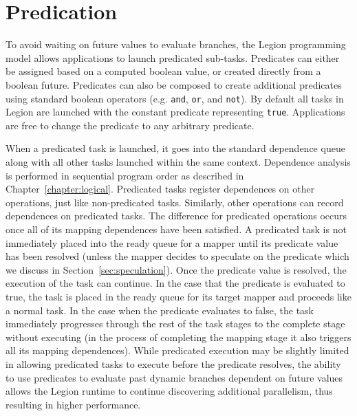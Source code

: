 \section{Predication}
\label{sec:predication}
To avoid waiting on future values to evaluate
branches, the Legion programming model allows applications
to launch predicated sub-tasks. Predicates can either
be assigned based on a computed boolean value, or 
created directly from a boolean future. Predicates can
also be composed to create additional predicates using
standard boolean operators (e.g. {\tt and}, {\tt or},
and {\tt not}). By default all tasks in Legion are
launched with the constant predicate representing 
{\tt true}. Applications are free to change the predicate
to any arbitrary predicate.

When a predicated task is launched, it goes into the
standard dependence queue along with all other tasks
launched within the same context. Dependence analysis
is performed in sequential program order as described
in Chapter~\ref{chapter:logical}. Predicated tasks
register dependences on other operations, just like
non-predicated tasks. Similarly, other operations can
record dependences on predicated tasks. The difference
for predicated operations occurs once all of its mapping 
dependences have been satisfied. A predicated task is
not immediately placed into the ready queue for a 
mapper until its predicate value has been resolved
(unless the mapper decides to speculate on the predicate
which we discuss in Section~\ref{sec:speculation}).
Once the predicate value is resolved, the execution
of the task can continue. In the case that the predicate
is evaluated to true, the task is placed in the ready
queue for its target mapper and proceeds like a normal 
task. In the case when the predicate evaluates to false, 
the task immediately progresses through the rest of the 
task stages to the complete stage without executing (in 
the process of completing the mapping stage it also 
triggers all its mapping dependences). While predicated 
execution may be slightly limited in allowing predicated 
tasks to execute before the predicate resolves, the ability
to use predicates to evaluate past dynamic branches
dependent on future values allows the Legion runtime
to continue discovering additional parallelism, 
thus resulting in higher performance.

